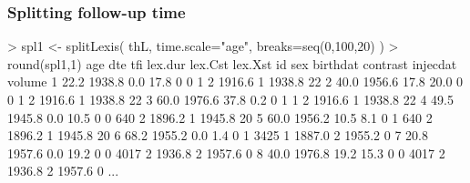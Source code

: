 \begin{frame}[fragile]
  \frametitle{Splitting follow-up time}
\footnotesize
\renewcommand{\baselinestretch}{0.9}
\begin{semiverbatim}
> spl1 <- splitLexis( thL, time.scale="age", breaks=seq(0,100,20) )
> round(spl1,1)
   age    dte  tfi lex.dur lex.Cst lex.Xst    id sex birthdat contrast injecdat volume
\alert<2>{1 22.2 1938.8  0.0    17.8       0       0    1   2   1916.6        1   1938.8     22}
\alert<2>{2 40.0 1956.6 17.8    20.0       0       0    1   2   1916.6        1   1938.8     22}
\alert<2>{3 60.0 1976.6 37.8     0.2       0       1    1   2   1916.6        1   1938.8     22}
\alert<3>{4 49.5 1945.8  0.0    10.5       0       0  640   2   1896.2        1   1945.8     20}
\alert<3>{5 60.0 1956.2 10.5     8.1       0       1  640   2   1896.2        1   1945.8     20}
\alert<4>{6 68.2 1955.2  0.0     1.4       0       1 3425   1   1887.0        2   1955.2      0}
\alert<5>{7 20.8 1957.6  0.0    19.2       0       0 4017   2   1936.8        2   1957.6      0}
\alert<5>{8 40.0 1976.8 19.2    15.3       0       0 4017   2   1936.8        2   1957.6      0}
...
\end{semiverbatim}
\renewcommand{\baselinestretch}{1.0}

\end{frame}

